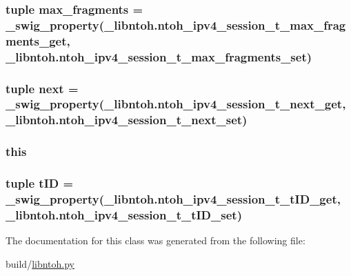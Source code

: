 \hypertarget{classlibntoh_1_1ntoh__ipv4__session__t_aae26317f4443b9f0f36780fb035d1ec9}{
\subsubsection[{max\-\_\-fragments}]{\setlength{\rightskip}{0pt plus 5cm}tuple max\-\_\-fragments = {\bf \-\_\-swig\-\_\-property}(\-\_\-libntoh.\-ntoh\-\_\-ipv4\-\_\-session\-\_\-t\-\_\-max\-\_\-fragments\-\_\-get, \-\_\-libntoh.\-ntoh\-\_\-ipv4\-\_\-session\-\_\-t\-\_\-max\-\_\-fragments\-\_\-set)\hspace{0.3cm}{\ttfamily [static]}}}\label{classlibntoh_1_1ntoh__ipv4__session__t_aae26317f4443b9f0f36780fb035d1ec9}
\hypertarget{classlibntoh_1_1ntoh__ipv4__session__t_a84e6dac37062f5a539ece8248c8567cc}{
\subsubsection[{next}]{\setlength{\rightskip}{0pt plus 5cm}tuple next = {\bf \-\_\-swig\-\_\-property}(\-\_\-libntoh.\-ntoh\-\_\-ipv4\-\_\-session\-\_\-t\-\_\-next\-\_\-get, \-\_\-libntoh.\-ntoh\-\_\-ipv4\-\_\-session\-\_\-t\-\_\-next\-\_\-set)\hspace{0.3cm}{\ttfamily [static]}}}\label{classlibntoh_1_1ntoh__ipv4__session__t_a84e6dac37062f5a539ece8248c8567cc}
\hypertarget{classlibntoh_1_1ntoh__ipv4__session__t_a05c09a5e9d53fa7adf0a7936038c2fa3}{
\subsubsection[{this}]{\setlength{\rightskip}{0pt plus 5cm}this}}\label{classlibntoh_1_1ntoh__ipv4__session__t_a05c09a5e9d53fa7adf0a7936038c2fa3}
\hypertarget{classlibntoh_1_1ntoh__ipv4__session__t_aa8af5c32a2a96a7fe7e14b7ebd2057ba}{
\subsubsection[{t\-I\-D}]{\setlength{\rightskip}{0pt plus 5cm}tuple t\-I\-D = {\bf \-\_\-swig\-\_\-property}(\-\_\-libntoh.\-ntoh\-\_\-ipv4\-\_\-session\-\_\-t\-\_\-t\-I\-D\-\_\-get, \-\_\-libntoh.\-ntoh\-\_\-ipv4\-\_\-session\-\_\-t\-\_\-t\-I\-D\-\_\-set)\hspace{0.3cm}{\ttfamily [static]}}}\label{classlibntoh_1_1ntoh__ipv4__session__t_aa8af5c32a2a96a7fe7e14b7ebd2057ba}


The documentation for this class was generated from the following file\-:\begin{DoxyCompactItemize}
\item 
build/\hyperlink{libntoh_8py}{libntoh.\-py}\end{DoxyCompactItemize}
